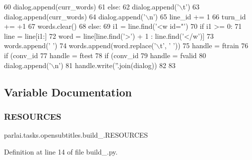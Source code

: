 \begin{DoxyCode}
60                                             dialog.append(curr\_words)
61                                         \textcolor{keywordflow}{else}:
62                                             dialog.append(\textcolor{stringliteral}{'\(\backslash\)t'})
63                                             dialog.append(curr\_words)
64                                             dialog.append(\textcolor{stringliteral}{'\(\backslash\)n'})
65                                             line\_id += 1
66                                         turn\_id += +1
67                                 words.clear()
68                             \textcolor{keywordflow}{else}:
69                                 i1 = line.find(\textcolor{stringliteral}{'<w id="'})
70                                 \textcolor{keywordflow}{if} i1 >= 0:
71                                     line = line[i1:]
72                                     word = line[line.find(\textcolor{stringliteral}{'>'}) + 1 : line.find(\textcolor{stringliteral}{'</w'})]
73                                     words.append(\textcolor{stringliteral}{' '})
74                                     words.append(word.replace(\textcolor{stringliteral}{'\(\backslash\)t'}, \textcolor{stringliteral}{' '}))
75                     handle = ftrain
76                     \textcolor{keywordflow}{if} (conv\_id %
77                         handle = ftest
78                     \textcolor{keywordflow}{if} (conv\_id %
79                         handle = fvalid
80                     dialog.append(\textcolor{stringliteral}{'\(\backslash\)n'})
81                     handle.write(\textcolor{stringliteral}{''}.join(dialog))
82 
83 
\end{DoxyCode}


\subsection{Variable Documentation}
\mbox{\label{namespaceparlai_1_1tasks_1_1opensubtitles_1_1build__2009_a850120232d120b52f2bef60aa580e398}} 
\subsubsection{\texorpdfstring{R\+E\+S\+O\+U\+R\+C\+ES}{RESOURCES}}
{\footnotesize\ttfamily parlai.\+tasks.\+opensubtitles.\+build\+\_.\+R\+E\+S\+O\+U\+R\+C\+ES}



Definition at line 14 of file build\+\_.\+py.

